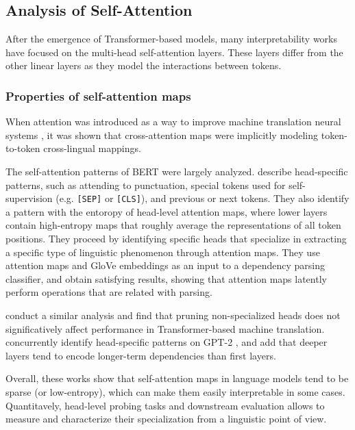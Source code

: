 \subsection{Analysis of Self-Attention}

After the emergence of Transformer-based models, many interpretability works have focused on the multi-head self-attention layers. These layers differ from the other linear layers as they model the interactions between tokens.

\subsubsection{Properties of self-attention maps}

When attention was introduced as a way to improve machine translation neural systems \citep{bahdanau_nmt}, it was shown that cross-attention maps were implicitly modeling token-to-token cross-lingual mappings. 

The self-attention patterns of BERT were largely analyzed. \citet{clark-etal-2019-bert} describe head-specific patterns, such as attending to punctuation, special tokens used for self-supervision (e.g. \texttt{[SEP]} or \texttt{[CLS]}), and previous or next tokens. They also identify a pattern with the entoropy of head-level attention maps, where lower layers contain high-entropy maps that roughly average the representations of all token positions. They proceed by identifying specific heads that specialize in extracting a specific type of linguistic phenomenon through attention maps. They use attention maps and GloVe embeddings as an input to a dependency parsing classifier, and obtain satisfying results, showing that attention maps latently perform operations that are related with parsing.

\citet{voita-etal-2019-analyzing} conduct a similar analysis and find that pruning non-specialized heads does not significatively affect performance in Transformer-based machine translation. \citet{vig-belinkov-2019-analyzing} concurrently identify head-specific patterns on GPT-2 \citep{gpt2}, and add that deeper layers tend to encode longer-term dependencies than first layers.

Overall, these works show that self-attention maps in language models tend to be sparse (or low-entropy), which can make them easily interpretable in some cases. Quantitavely, head-level probing tasks and downstream evaluation allows to measure and characterize their specialization from a linguistic point of view.

